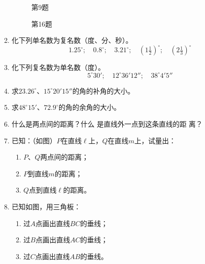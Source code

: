 \begin{enumerate}
\begin{figure}[htp]\centering
    \begin{minipage}[t]{0.48\textwidth}
    \centering
{}
    \caption*{第9题}
    \end{minipage}
    \begin{minipage}[t]{0.48\textwidth}
    \centering
    \caption*{第16题}
    \end{minipage}
    \end{figure}

\item 化下列单名数为复名数（度、分、秒）。
\[1.25^{\circ};\quad 0.8^{\circ};\quad 3.21^{\circ};\quad (1\tfrac{1}{2})^{\circ};\quad (2\tfrac{1}{3})^{\circ}\]
\item 化下列复名数为单名数（度）。
\[5^{\circ}30';\quad 12^{\circ}36'12'';\quad 38^{\circ}4'5''\]
\item 求$23.26^{\circ}$、$15^{\circ}20'15''$的角的补角的大小。
\item 求$48^{\circ}15'$、$72.9^{\circ}$的角的余角的大小。
\item 什么是两点间的距离？什么
是直线外一点到这条直线的距
离？



\item 已知：（如图）$P$在直线$\ell$上，$Q$在直线$m$上，试量出：
\begin{enumerate}
\item $P$、$Q$两点间的距离；
\item $P$到直线$m$的距离；
\item $Q$点到直线$\ell$的距离。
\end{enumerate}
\item 已知如图，用三角板：
\begin{enumerate}
\item 过$A$点画出直线$BC$的垂线；
\item 过$B$点画出直线$AC$的垂线；
\item 过$C$点画出直线$AB$的垂线。
\end{enumerate}


\end{enumerate}
